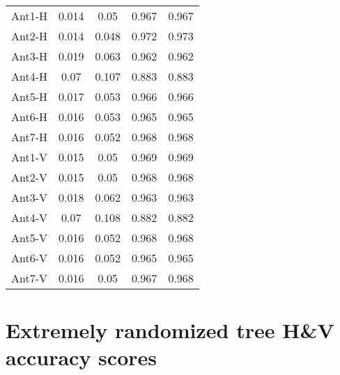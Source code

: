 \begin{table}[H]
\begin{center}
{\begin{tabular}{| c | c | c | c | c |}
Ant1-H&0.014 & 0.05  & 0.967    & 0.967     \\
Ant2-H&0.014 & 0.048 & 0.972    & 0.973     \\
Ant3-H&0.019 & 0.063 & 0.962    & 0.962     \\
Ant4-H&0.07  & 0.107 & 0.883    & 0.883     \\
Ant5-H&0.017 & 0.053 & 0.966    & 0.966     \\
Ant6-H&0.016 & 0.053 & 0.965    & 0.965     \\
Ant7-H&0.016 & 0.052 & 0.968    & 0.968     \\
Ant1-V&0.015 & 0.05  & 0.969    & 0.969     \\
Ant2-V&0.015 & 0.05  & 0.968    & 0.968     \\
Ant3-V&0.018 & 0.062 & 0.963    & 0.963     \\
Ant4-V&0.07  & 0.108 & 0.882    & 0.882     \\
Ant5-V&0.016 & 0.052 & 0.968    & 0.968     \\
Ant6-V&0.016 & 0.052 & 0.965    & 0.965     \\
Ant7-V&0.016 & 0.05  & 0.967    & 0.968     \\ 
 \hline

\end{tabular}}
\end{center}
\end{table}


\section{Extremely randomized tree H\&V accuracy scores}

